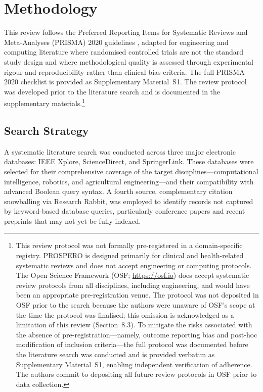 \documentclass[review,3p,times]{elsarticle}
\begin{document}
\section{Methodology}

This review follows the Preferred Reporting Items for Systematic Reviews and Meta-Analyses (PRISMA) 2020 guidelines \cite{page2021}, adapted for engineering and computing literature where randomised controlled trials are not the standard study design and where methodological quality is assessed through experimental rigour and reproducibility rather than clinical bias criteria. The full PRISMA 2020 checklist is provided as Supplementary Material~S1. The review protocol was developed prior to the literature search and is documented in the supplementary materials.\footnote{This review protocol was not formally pre-registered in a domain-specific registry. PROSPERO is designed primarily for clinical and health-related systematic reviews and does not accept engineering or computing protocols. The Open Science Framework (OSF; \url{https://osf.io}) does accept systematic review protocols from all disciplines, including engineering, and would have been an appropriate pre-registration venue. The protocol was not deposited in OSF prior to the search because the authors were unaware of OSF's scope at the time the protocol was finalised; this omission is acknowledged as a limitation of this review (Section~8.3). To mitigate the risks associated with the absence of pre-registration---namely, outcome reporting bias and post-hoc modification of inclusion criteria---the full protocol was documented before the literature search was conducted and is provided verbatim as Supplementary Material~S1, enabling independent verification of adherence. The authors commit to depositing all future review protocols in OSF prior to data collection.}

\subsection{Search Strategy}

A systematic literature search was conducted across three major electronic databases: IEEE Xplore, ScienceDirect, and SpringerLink. These databases were selected for their comprehensive coverage of the target disciplines---computational intelligence, robotics, and agricultural engineering---and their compatibility with advanced Boolean query syntax. A fourth source, complementary citation snowballing via Research Rabbit, was employed to identify records not captured by keyword-based database queries, particularly conference papers and recent preprints that may not yet be fully indexed.
\end{document}
